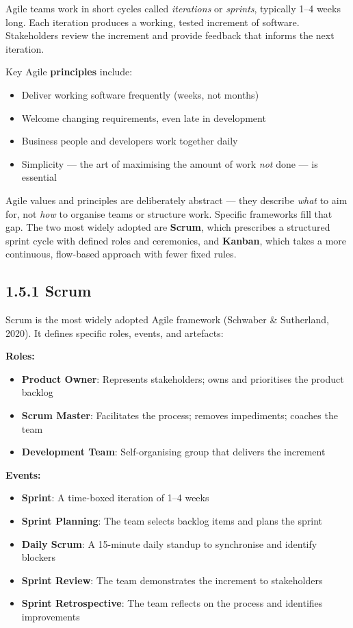 \documentclass[11pt,a4paper]{book}
\begin{document}
Agile teams work in short cycles called \textit{iterations} or \textit{sprints}, typically 1--4 weeks long. Each iteration produces a working, tested increment of software. Stakeholders review the increment and provide feedback that informs the next iteration.

Key Agile \textbf{principles} include:

\begin{itemize}
  \item Deliver working software frequently (weeks, not months)
  \item Welcome changing requirements, even late in development
  \item Business people and developers work together daily
  \item Simplicity --- the art of maximising the amount of work \textit{not} done --- is essential
\end{itemize}

Agile values and principles are deliberately abstract --- they describe \textit{what} to aim for, not \textit{how} to organise teams or structure work. Specific frameworks fill that gap. The two most widely adopted are \textbf{Scrum}, which prescribes a structured sprint cycle with defined roles and ceremonies, and \textbf{Kanban}, which takes a more continuous, flow-based approach with fewer fixed rules.

\subsection{1.5.1 Scrum}

Scrum is the most widely adopted Agile framework (Schwaber \& Sutherland, 2020). It defines specific roles, events, and artefacts:

\textbf{Roles:}
\begin{itemize}
  \item \textbf{Product Owner}: Represents stakeholders; owns and prioritises the product backlog
  \item \textbf{Scrum Master}: Facilitates the process; removes impediments; coaches the team
  \item \textbf{Development Team}: Self-organising group that delivers the increment
\end{itemize}

\textbf{Events:}
\begin{itemize}
  \item \textbf{Sprint}: A time-boxed iteration of 1--4 weeks
  \item \textbf{Sprint Planning}: The team selects backlog items and plans the sprint
  \item \textbf{Daily Scrum}: A 15-minute daily standup to synchronise and identify blockers
  \item \textbf{Sprint Review}: The team demonstrates the increment to stakeholders
  \item \textbf{Sprint Retrospective}: The team reflects on the process and identifies improvements
\end{itemize}
\end{document}
